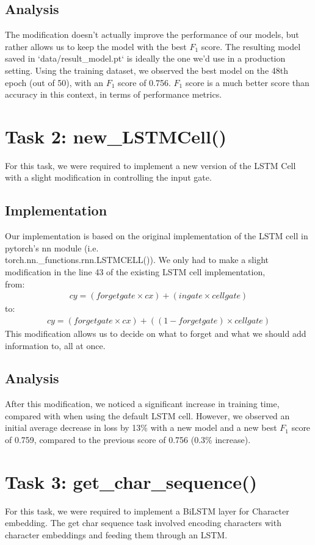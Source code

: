 \documentclass{article}
\begin{document}
\subsection*{Analysis}
The modification doesn't actually improve the performance of our models, but rather allows us to keep the model with the best $F_1$ score. The resulting model saved in `data/result\_model.pt` is ideally the one we'd use in a production setting. Using the training dataset, we observed the best model on the 48th epoch (out of 50), with an $F_1$ score of 0.756. $F_1$ score is a much better score than accuracy in this context, in terms of performance metrics.

\section*{Task 2: new\_LSTMCell()}
For this task, we were required to implement a new version of the LSTM Cell with a slight modification in controlling the input gate.
\subsection*{Implementation}
Our implementation is based on the original implementation of the LSTM cell in pytorch's nn module (i.e. \\torch.nn.\_functions.rnn.LSTMCELL()). We only had to make a slight modification in the line 43 of the existing LSTM cell implementation,\\ from:
\begin{align*}
cy = (forgetgate \times cx) + (ingate \times cellgate)
\end{align*}
to:
\begin{align*}
cy = (forgetgate \times cx) + ((1-forgetgate) \times cellgate)
\end{align*}
This modification allows us to decide on what to forget and what we should add information to, all at once.
\subsection*{Analysis}
After this modification, we noticed a significant increase in training time, compared with when using the default LSTM cell. However, we observed an initial average decrease in loss by 13\% with a new model and a new best $F_1$ score of 0.759, compared to the previous score of 0.756 (0.3\% increase).

\section*{Task 3: get\_char\_sequence()}
For this task, we were required to implement a BiLSTM layer for Character embedding. The get char sequence task involved encoding characters with character embeddings and feeding them through an LSTM.
\end{document}
